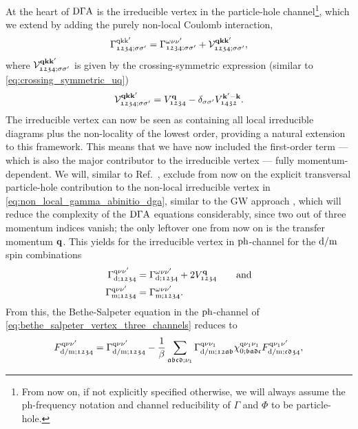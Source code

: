 \documentclass[../../main.tex]{subfiles}
\begin{document}
At the heart of $\text{D}\Gamma\text{A}$ is the irreducible vertex in the particle-hole channel\footnote{From now on, if not explicitly specified otherwise, we will always assume the ph-frequency notation and channel reducibility of $\Gamma$ and $\Phi$ to be particle-hole.}, which we extend by adding the purely non-local Coulomb interaction,
\begin{align}\label{eq:non_local_gamma_abinitio_dga}
	\Gamma^{\text{q}\text{k}\text{k}'}_{\mathfrak{1234};\sigma\sigma'}=\Gamma^{\omega\nu\nu'}_{\mathfrak{1234};\sigma\sigma'}+\mathcal{V}^{\textbf{qkk}'}_{\mathfrak{1234};\sigma\sigma'},
\end{align}
where $\mathcal{V}^{\textbf{qkk}'}_{\mathfrak{1234};\sigma\sigma'}$ is given by the crossing-symmetric expression (similar to \eqref{eq:crossing_symmetric_uq})
\begin{align}
	\mathcal{V}^{\textbf{qkk}'}_{\mathfrak{1234};\sigma\sigma'}=V^{\textbf{q}}_{\mathfrak{1234}}-\delta_{\sigma\sigma'}V^{\textbf{k}'-\textbf{k}}_{\mathfrak{1432}}.
\end{align}
The irreducible vertex can now be seen as containing all local irreducible diagrams plus the non-locality of the lowest order, providing a natural extension to this framework. This means that we have now included the first-order term --- which is also the major contributor to the irreducible vertex --- fully momentum-dependent. We will, similar to Ref.~\cite{Galler2017}, exclude from now on the explicit transversal particle-hole contribution to the non-local irreducible vertex in \eqref{eq:non_local_gamma_abinitio_dga}, similar to the GW approach \cite{Tomczak2017}, which will reduce the complexity of the $\text{D}\Gamma\text{A}$ equations considerably, since two out of three momentum indices vanish; the only leftover one from now on is the transfer momentum $\textbf{q}$. This yields for the irreducible vertex in $\text{ph}$-channel for the $\text{d}/\text{m}$ spin combinations
\begin{subequations}\label{eq:gamma_dens_magn_dga}
\begin{align}
	\Gamma^{\text{q}\nu\nu'}_{\text{d};\mathfrak{1234}}&=\Gamma^{\omega\nu\nu'}_{\text{d};\mathfrak{1234}}+2 V^{\textbf{q}}_{\mathfrak{1234}}\qquad\text{and}\\
	\Gamma^{\text{q}\nu\nu'}_{\text{m};\mathfrak{1234}}&=\Gamma^{\omega\nu\nu'}_{\text{m};\mathfrak{1234}}.\label{eq:gamma_magn_dga}
\end{align}
\end{subequations}
From this, the Bethe-Salpeter equation in the $\text{ph}$-channel of \eqref{eq:bethe_salpeter_vertex_three_channels} reduces to
\begin{align}
	F_{\text{d}/\text{m};\mathfrak{1234}}^{\text{q}\nu\nu'}=\Gamma^{\text{q}\nu\nu'}_{\text{d}/\text{m};\mathfrak{1234}}-\frac1\beta\sum_{\mathfrak{abcd};\nu_1}\Gamma^{\text{q}\nu\nu_1}_{\text{d}/\text{m};\mathfrak{12ab}}\chi_{0;\mathfrak{badc}}^{\text{q}\nu_1\nu_1} F_{\text{d}/\text{m};\mathfrak{cd34}}^{\text{q}\nu_1\nu'},
\end{align}
\end{document}
